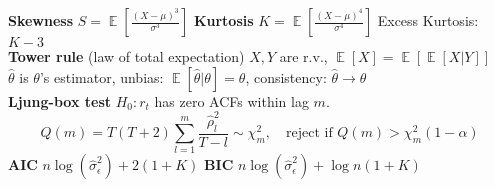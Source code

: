 \documentclass[10pt,landscape, a4paper]{article}
\theoremstyle{remark}
\newcommand{\E}{\operatorname{\mathbb{E}}}
\begin{document}
\setlength{\abovedisplayskip}{0pt}%
\setlength{\belowdisplayskip}{0pt}%
\setlength{\abovedisplayshortskip}{-2pt}%
\setlength{\belowdisplayshortskip}{-2pt}%
\setlength{\jot}{0pt}%

\raggedright


\scriptsize
\begin{multicols*}{3}
\textbf{Skewness} $S = \E [\frac{(X - \mu)^3}{\sigma^3}]$ \textbf{Kurtosis} $K = \E [\frac{(X - \mu)^4}{\sigma^4}]$ Excess Kurtosis: $K-3$\\
\textbf{Tower rule} (law of total expectation) $X, Y$ are r.v., $\E[X] = \E [\E [X \lvert Y ]]$\\
$\hat{\theta}$ is $\theta$'s estimator, unbias: $\E[\hat{\theta} \lvert \theta] = \theta$, consistency: $\hat{\theta} \to \theta$\\
\textbf{Ljung-box test} $H_0: r_t$ has zero ACFs within lag $m$. $$Q(m) = T(T+2) \sum^m_{l=1} \frac{\hat{\rho}^2_l}{T-l} \sim \chi^2_m, \quad \text{reject if $Q(m) > \chi^2_m (1-\alpha)$}$$
\textbf{AIC} $n\log (\hat{\sigma}^2_\epsilon) + 2(1+K)$   \textbf{BIC} $n\log (\hat{\sigma}^2_\epsilon) + \log n(1+K)$\\


\end{multicols*}
\end{document}
